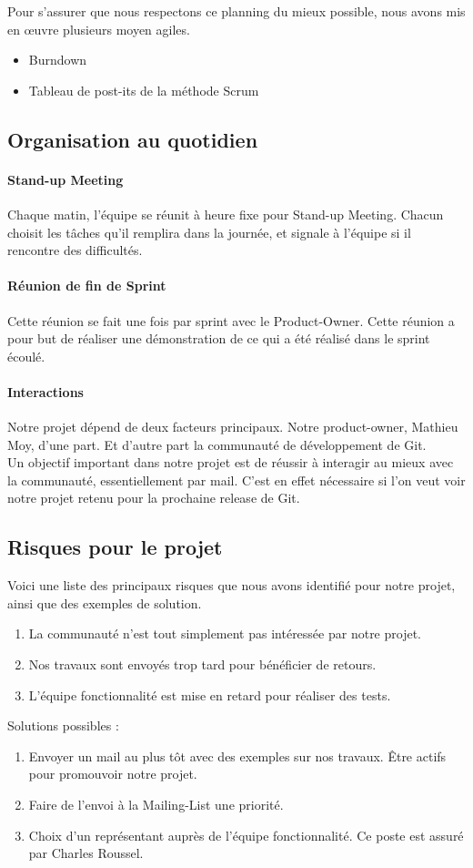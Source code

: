 \documentclass[11pt]{article}
\begin{document}
Pour s'assurer que nous respectons ce planning du mieux possible, nous avons mis en œuvre plusieurs moyen agiles.\\
\begin{itemize}
\item Burndown
\item Tableau de post-its de la méthode Scrum
\end{itemize}

\subsection{Organisation au quotidien}
\paragraph{Stand-up Meeting}
Chaque matin, l'équipe se réunit à heure fixe pour Stand-up Meeting.
Chacun choisit les tâches qu'il remplira dans la journée, et signale à l'équipe si il rencontre des difficultés. 
\paragraph{Réunion de fin de Sprint}
Cette réunion se fait une fois par sprint avec le Product-Owner. Cette réunion a pour but de réaliser une démonstration de ce qui a été réalisé dans le sprint écoulé.
\paragraph{Interactions}
Notre projet dépend de deux facteurs principaux. Notre product-owner, Mathieu Moy, d'une part. Et d'autre part la communauté de développement de Git.\\
Un objectif important dans notre projet est de réussir à interagir au mieux avec la communauté, essentiellement par mail. C'est en effet nécessaire si l'on veut voir notre projet retenu pour la prochaine release de Git.
\subsection{Risques pour le projet}
Voici une liste des principaux risques que nous avons identifié pour notre projet, ainsi que des exemples de solution.
\begin{enumerate}
\item La communauté n'est tout simplement pas intéressée par notre projet. 
\item Nos travaux sont envoyés trop tard pour bénéficier de retours.
\item L'équipe fonctionnalité est mise en retard pour réaliser des tests.
\end{enumerate}

Solutions possibles :
\begin{enumerate}
\item Envoyer un mail au plus tôt avec des exemples sur nos travaux. Être actifs pour promouvoir notre projet.
\item Faire de l'envoi à la Mailing-List une priorité.
\item Choix d'un représentant auprès de l'équipe fonctionnalité. Ce poste est assuré par Charles Roussel. 
\end{enumerate}
\end{document}
